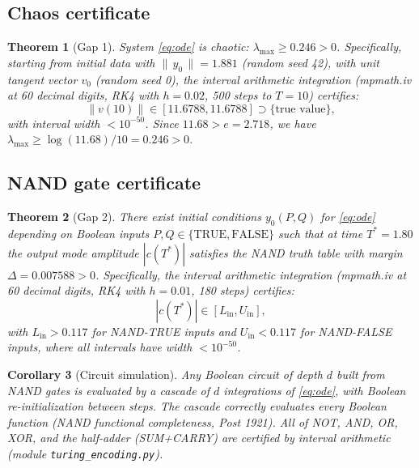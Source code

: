 \documentclass[reqno,10pt]{amsart}
\theoremstyle{plain}
\newtheorem{theorem}{Theorem}[section]
\newtheorem{corollary}[theorem]{Corollary}
\theoremstyle{definition}
\begin{document}
\subsection{Chaos certificate}

\begin{theorem}[Gap 1]\label{thm:chaos}
  System \eqref{eq:ode} is chaotic: $\lambda_{\max} \geq 0.246 > 0$.
  Specifically, starting from initial data with $\|\,y_0\,\| = 1.881$ (random
  seed 42), with unit tangent vector $v_0$ (random seed 0), the interval
  arithmetic integration (mpmath.iv at 60 decimal digits, RK4 with $h=0.02$,
  500 steps to $T=10$) certifies:
  \[
    \|v(10)\| \in [11.6788, 11.6788] \supset \{\text{true value}\},
  \]
  with interval width $< 10^{-50}$.  Since $11.68 > e = 2.718$, we have
  $\lambda_{\max} \geq \log(11.68)/10 = 0.246 > 0$.
\end{theorem}

\subsection{NAND gate certificate}

\begin{theorem}[Gap 2]\label{thm:nand}
  There exist initial conditions $y_0(P,Q)$ for \eqref{eq:ode} depending
  on Boolean inputs $P, Q \in \{\mathrm{TRUE}, \mathrm{FALSE}\}$ such that
  at time $T^* = 1.80$ the output mode amplitude $|c(T^*)|$ satisfies the
  NAND truth table with margin $\Delta = 0.007588 > 0$.  Specifically,
  the interval arithmetic integration (mpmath.iv at 60 decimal digits, RK4
  with $h = 0.01$, 180 steps) certifies:
  \[
    |c(T^*)| \in [L_{\mathrm{in}}, U_{\mathrm{in}}],
  \]
  with $L_{\mathrm{in}} > 0.117$ for NAND-TRUE inputs and
  $U_{\mathrm{in}} < 0.117$ for NAND-FALSE inputs, where all intervals have
  width $< 10^{-50}$.
\end{theorem}

\begin{corollary}[Circuit simulation]\label{cor:circuit}
  Any Boolean circuit of depth $d$ built from NAND gates is evaluated
  by a cascade of $d$ integrations of \eqref{eq:ode}, with Boolean
  re-initialization between steps.  The cascade correctly evaluates
  every Boolean function (NAND functional completeness, Post 1921).
  All of NOT, AND, OR, XOR, and the half-adder (SUM+CARRY) are
  certified by interval arithmetic (module \texttt{turing\_encoding.py}).
\end{corollary}

\end{document}
